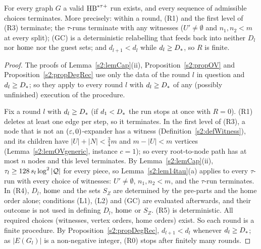 \begin{proposition}\label{s2:propExists}
For every graph $G$ a valid $\mathrm{HB}^{*\tau{+}}$ run exists, and every sequence of admissible
choices terminates. More precisely: within a round, (R1) and the first level of
(R3) terminate; the $\tau$-runs terminate with any witnesses ($U'\ne\emptyset$
and $n_1,n_2<m$ at every split); (GC) is a deterministic relabelling that feeds
back into neither $D_l$ nor $\mathrm{home}$ nor the guest sets; and $d_{l+1}<d_l$ while
$d_l\ge D_{*}$, so $R$ is finite.
\deps{\ref{s2:lem14tau}, \ref{s2:propDegRec}, \ref{s2:defHBtp}, \ref{s2:lemCap}, \ref{s2:lemOVgeneric}, \ref{s2:defWitness}, \ref{s2:propOV}}
\end{proposition}

\begin{proof}
The proofs of Lemma~\ref{s2:lemCap}(ii), Proposition~\ref{s2:propOV} and
Proposition~\ref{s2:propDegRec} use only the data of the round $l$ in question
and $d_l\ge D_{*}$; so they apply to every round $l$ with $d_l\ge D_{*}$ of any
(possibly unfinished) execution of the procedure.

Fix a round $l$ with $d_l\ge D_{*}$ (if $d_1<D_{*}$ the run stops at once
with $R=0$). (R1) deletes at least one edge per step, so it terminates. In the
first level of (R3), a node that is not an $(\varepsilon,0)$-expander has a witness
(Definition~\ref{s2:defWitness}), and its children have $|U|+|N|<\frac34m$ and
$m-|U|<m$ vertices (Lemma~\ref{s2:lemOVgeneric}, instance $c=1$); so every
root-to-node path has at most $n$ nodes and this level terminates. By
Lemma~\ref{s2:lemCap}(ii), $\tau_l\ge128\,s_l\log^2|\mathcal{Q}|$ for every piece,
so Lemma~\ref{s2:lem14tau}(a) applies to every $\tau$-run with every choice of
witnesses: $U'\ne\emptyset$, $n_1,n_2<m$, and the $\tau$-run terminates.
In (R4), $D_l$, $\mathrm{home}$ and the sets $S_Z$ are determined by the pre-parts and
the home order alone; conditions (L1), (L2) and (GC) are evaluated afterwards,
and their outcome is not used in defining $D_l$, $\mathrm{home}$ or $S_Z$. (R5) is
deterministic. All required choices (witnesses, vertex orders, home orders)
exist. So each round is a finite procedure. By
Proposition~\ref{s2:propDegRec}, $d_{l+1}<d_l$ whenever $d_l\ge D_{*}$; as
$|E(G_l)|$ is a non-negative integer, (R0) stops after finitely many rounds.
\end{proof}

